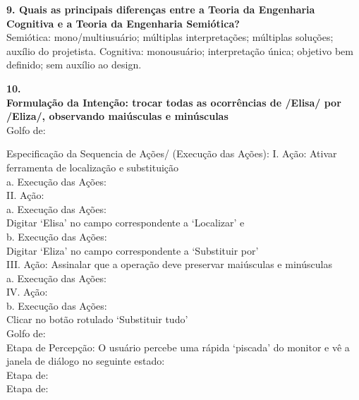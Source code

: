 \documentclass[9pt, twocolumn, article]{memoir}
\begin{document}
\textbf{9. Quais as principais diferenças entre a Teoria da Engenharia Cognitiva e a Teoria da Engenharia Semiótica?}\\
Semiótica: mono/multiusuário; múltiplas interpretações; múltiplas soluções; auxílio do projetista. Cognitiva: monousuário; interpretação única; objetivo bem definido; sem auxílio ao design.

\textbf{10.\\Formulação da Intenção: trocar todas as ocorrências de /Elisa/ por /Eliza/, observando maiúsculas e minúsculas} \\Golfo de:

Especificação da Sequencia de Ações/ (Execução das Ações):
I. Ação: Ativar ferramenta de localização e substituição\\a. Execução das Ações:\\
II. Ação:\\
a. Execução das Ações:\\
Digitar ‘Elisa’ no campo correspondente a ‘Localizar’ e\\
b. Execução das Ações:\\
Digitar ‘Eliza’ no campo correspondente a ‘Substituir por’\\
III. Ação: Assinalar que a operação deve preservar maiúsculas e minúsculas\\
a. Execução das Ações:\\
IV. Ação:\\
b. Execução das Ações:\\
Clicar no botão rotulado ‘Substituir tudo’\\
Golfo de: \\
Etapa de Percepção: O usuário percebe uma rápida ‘piscada’ do monitor e vê a janela de diálogo no seguinte
estado:\\
Etapa de:\\
Etapa de:\\
\end{document}
